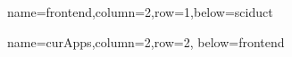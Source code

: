 \documentclass[landscape,a0paper,fontscale=0.285]{baposter} %
\begin{document}
\begin{poster}
{}


          {name=frontend,column=2,row=1,below=sciduct}{

} 



          {name=curApps,column=2,row=2, below=frontend}{

} 


\end{poster}
\end{document}
